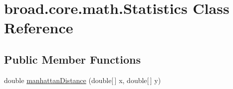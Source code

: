 \hypertarget{classbroad_1_1core_1_1math_1_1_statistics}{\section{broad.\+core.\+math.\+Statistics Class Reference}
\label{classbroad_1_1core_1_1math_1_1_statistics}
}
\subsection*{Public Member Functions}
\begin{DoxyCompactItemize}
\item 
double \hyperlink{classbroad_1_1core_1_1math_1_1_statistics_a11b6b83e982e8df2fdaec12be5407078}{manhattan\+Distance} (double\mbox{[}$\,$\mbox{]} x, double\mbox{[}$\,$\mbox{]} y)
\end{DoxyCompactItemize}
